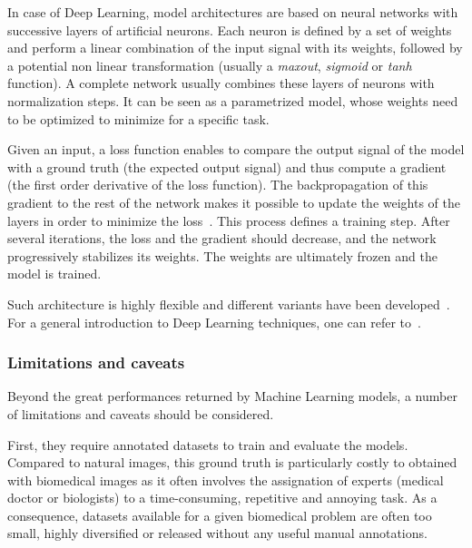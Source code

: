 In case of Deep Learning, model architectures are based on neural networks with successive layers of artificial neurons.
Each neuron is defined by a set of weights and perform a linear combination of the input signal with its weights, followed by a potential non linear transformation (usually a \emph{maxout}, \emph{sigmoid} or \emph{tanh} function).
A complete network usually combines these layers of neurons with normalization steps.
It can be seen as a parametrized model, whose weights need to be optimized to minimize for a specific task.

Given an input, a loss function enables to compare the output signal of the model with a ground truth (the expected output signal) and thus compute a gradient (the first order derivative of the loss function).
The backpropagation of this gradient to the rest of the network makes it possible to update the weights of the layers in order to minimize the loss~\cite{rumelhart_learning_1986}.
This process defines a training step.
After several iterations, the loss and the gradient should decrease, and the network progressively stabilizes its weights.
The weights are ultimately frozen and the model is trained.

Such architecture is highly flexible and different variants have been developed~\cite{lecun_deep_2015}.
For a general introduction to Deep Learning techniques, one can refer to~\cite{Goodfellow_2016}.

\subsubsection{Limitations and caveats}

Beyond the great performances returned by Machine Learning models, a number of limitations and caveats should be considered.

First, they require annotated datasets to train and evaluate the models.
Compared to natural images, this ground truth is particularly costly to obtained with biomedical images as it often involves the assignation of experts (medical doctor or biologists) to a time-consuming, repetitive and annoying task.
As a consequence, datasets available for a given biomedical problem are often too small, highly diversified or released without any useful manual annotations.


